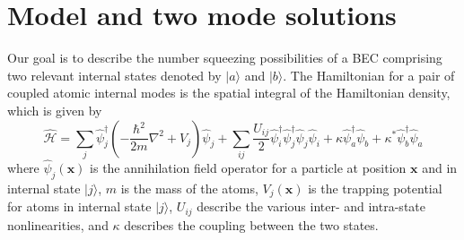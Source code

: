 \documentclass{iopart}
\begin{document}
\section{Model and two mode solutions}
\label{secTwoModeAnalytic}
Our goal is to describe the number squeezing possibilities of a BEC comprising two relevant internal states denoted by $|a\rangle$ and $|b\rangle$.  The Hamiltonian for a pair of coupled atomic internal modes is the spatial integral of the Hamiltonian density, which is given by
\begin{equation}
\hat{\mathcal{H}} = \sum_{j} \hat{\psi}_j^{\dagger}\left(-\frac{\hbar^2}{2 m}\nabla^2+V_j\right)\hat{\psi}_j 
          + \sum_{i j}\frac{U_{i j}}{2} \hat{\psi}_i^{\dagger} \hat{\psi}_j^{\dagger} \hat{\psi}_j \hat{\psi}_i
          + \kappa \hat{\psi}_a^{\dagger} \hat{\psi}_b + \kappa^* \hat{\psi}_b^{\dagger}  \hat{\psi}_a
\label{eqFieldHamiltonian}
\end{equation}
where $\hat{\psi}_j(\mathbf{x})$ is the annihilation field operator for a particle at position $\mathbf{x}$ and in internal state $|j\rangle$, $m$ is the mass of the atoms, $V_j(\mathbf{x})$ is the trapping potential for atoms in internal state $|j\rangle$, $U_{ij}$ describe the various inter- and intra-state nonlinearities, and $\kappa$ describes the coupling between the two states.  
\end{document}

